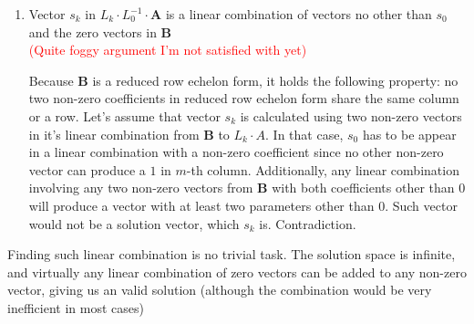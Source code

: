 \begin{description}
\begin{enumerate}
    \item Vector $s_k$ in $L_k \cdot L_0^{-1} \cdot \boldsymbol{A}$ is a linear combination of vectors no other than $s_0$ and the zero vectors in $\boldsymbol{B}$\hfill \\
        \textcolor{red}{(Quite foggy argument I'm not satisfied with yet)}

        Because $\boldsymbol{B}$ is a reduced row echelon form, it holds the following property: no two non-zero coefficients in reduced row echelon form share the same column or a row.
        Let's assume that vector $s_k$ is calculated using two non-zero vectors in it's linear combination from $\boldsymbol{B}$ to $L_k \cdot A$.
        In that case, $s_0$ has to be appear in a linear combination with a non-zero coefficient since no other non-zero vector can produce a $1$ in $m$-th column.
        Additionally, any linear combination involving any two non-zero vectors from $\boldsymbol{B}$ with both coefficients other than $0$ will produce a vector with at least two parameters other than $0$.
        Such vector would not be a solution vector, which $s_k$ is. Contradiction.
    \end{enumerate}
\end{description}

Finding such linear combination is no trivial task.
The solution space is infinite, and virtually any linear combination of zero vectors can be added to any non-zero vector, giving us an valid solution (although the combination would be very inefficient in most cases)

